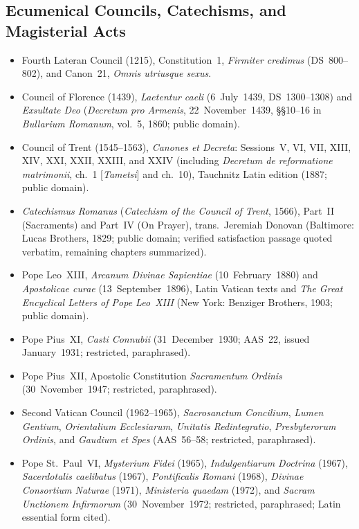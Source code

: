 \subsection{Ecumenical Councils, Catechisms, and Magisterial Acts}
\begin{itemize}
\item Fourth Lateran Council (1215), Constitution~1, \emph{Firmiter credimus} (DS~800--802), and Canon~21, \emph{Omnis utriusque sexus}.
\item Council of Florence (1439), \emph{Laetentur caeli} (6~July~1439, DS~1300--1308) and \emph{Exsultate Deo} (\emph{Decretum pro Armenis}, 22~November~1439, \S\S10--16 in \emph{Bullarium Romanum}, vol.~5, 1860; public domain).
\item Council of Trent (1545--1563), \emph{Canones et Decreta}: Sessions~V, VI, VII, XIII, XIV, XXI, XXII, XXIII, and XXIV (including \emph{Decretum de reformatione matrimonii}, ch.~1 [\emph{Tametsi}] and ch.~10), Tauchnitz Latin edition (1887; public domain).
\item \emph{Catechismus Romanus} (\emph{Catechism of the Council of Trent}, 1566), Part~II (Sacraments) and Part~IV (On Prayer), trans.\ Jeremiah Donovan (Baltimore: Lucas Brothers, 1829; public domain; verified satisfaction passage quoted verbatim, remaining chapters summarized).
\item Pope Leo~XIII, \emph{Arcanum Divinae Sapientiae} (10~February~1880) and \emph{Apostolicae curae} (13~September~1896), Latin Vatican texts and \emph{The Great Encyclical Letters of Pope Leo~XIII} (New York: Benziger Brothers, 1903; public domain).
\item Pope Pius~XI, \emph{Casti Connubii} (31~December~1930; AAS~22, issued January~1931; restricted, paraphrased).
\item Pope Pius~XII, Apostolic Constitution \emph{Sacramentum Ordinis} (30~November~1947; restricted, paraphrased).
\item Second Vatican Council (1962--1965), \emph{Sacrosanctum Concilium}, \emph{Lumen Gentium}, \emph{Orientalium Ecclesiarum}, \emph{Unitatis Redintegratio}, \emph{Presbyterorum Ordinis}, and \emph{Gaudium et Spes} (AAS~56--58; restricted, paraphrased).
\item Pope St.~Paul~VI, \emph{Mysterium Fidei} (1965), \emph{Indulgentiarum Doctrina} (1967), \emph{Sacerdotalis caelibatus} (1967), \emph{Pontificalis Romani} (1968), \emph{Divinae Consortium Naturae} (1971), \emph{Ministeria quaedam} (1972), and \emph{Sacram Unctionem Infirmorum} (30~November~1972; restricted, paraphrased; Latin essential form cited).

\end{itemize}
